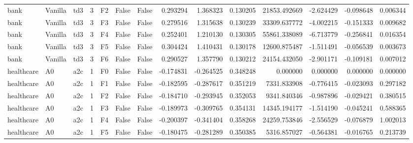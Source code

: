 \begin{tabular}{lllrlllrrrrrrr}
      bank & Vanilla &       td3 &     3 &  F2 &           False &            False &  0.293294 &  1.368323 & 0.130205 &     21853.492669 &          -2.624429 &       -0.098648 &            0.006344 \\
      bank & Vanilla &       td3 &     3 &  F3 &           False &            False &  0.279516 &  1.315638 & 0.130239 &     33309.637772 &          -4.002215 &       -0.151333 &            0.009682 \\
      bank & Vanilla &       td3 &     3 &  F4 &           False &            False &  0.252401 &  1.210130 & 0.130305 &     55861.338089 &          -6.713779 &       -0.256841 &            0.016354 \\
      bank & Vanilla &       td3 &     3 &  F5 &           False &            False &  0.304424 &  1.410431 & 0.130178 &     12600.875487 &          -1.511491 &       -0.056539 &            0.003673 \\
      bank & Vanilla &       td3 &     3 &  F6 &           False &            False &  0.290527 &  1.357790 & 0.130212 &     24154.432050 &          -2.901171 &       -0.109181 &            0.007012 \\
healthcare &      A0 &       a2c &     1 &  F0 &           False &            False & -0.174831 & -0.264525 & 0.348248 &         0.000000 &           0.000000 &        0.000000 &            0.000000 \\
healthcare &      A0 &       a2c &     1 &  F1 &           False &            False & -0.182595 & -0.287617 & 0.351219 &      7331.833908 &          -0.776415 &       -0.023093 &            0.297182 \\
healthcare &      A0 &       a2c &     1 &  F2 &           False &            False & -0.184710 & -0.293945 & 0.352053 &      9341.840346 &          -0.987896 &       -0.029421 &            0.380515 \\
healthcare &      A0 &       a2c &     1 &  F3 &           False &            False & -0.189973 & -0.309765 & 0.354131 &     14345.194177 &          -1.514190 &       -0.045241 &            0.588365 \\
healthcare &      A0 &       a2c &     1 &  F4 &           False &            False & -0.200397 & -0.341404 & 0.358268 &     24259.753846 &          -2.556529 &       -0.076879 &            1.002013 \\
healthcare &      A0 &       a2c &     1 &  F5 &           False &            False & -0.180475 & -0.281289 & 0.350385 &      5316.857027 &          -0.564381 &       -0.016765 &            0.213739 \\

\end{tabular}
